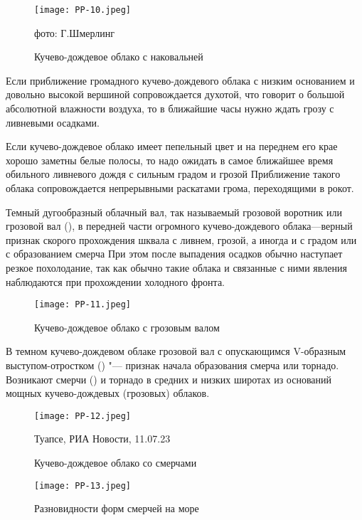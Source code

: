 \begin{figure}[htb]
  \centering{}
  \texttt{[image: PP-10.jpeg]}
  \caption{Кучево-дождевое облако с наковальней}
  \label{fig:pp10}
  \small
  \centering{}фото: Г.Шмерлинг
\end{figure}


 Если приближение громадного кучево-дождевого облака с низким
основанием и довольно высокой вершиной сопровождается духотой, что
говорит о большой абсолютной влажности воздуха, то в ближайшие часы
нужно ждать грозу с ливневыми осадками.

 Если кучево-дождевое облако имеет пепельный цвет и на переднем
его крае хорошо заметны белые полосы, то надо ожидать в самое
ближайшее время обильного ливневого дождя с сильным градом и грозой
Приближение такого облака сопровождается непрерывными раскатами грома,
переходящими в рокот.

 Темный дугообразный облачный вал, так называемый грозовой
воротник или грозовой вал (), в передней части огромного
кучево-дождевого облака—верный признак скорого прохождения шквала с
ливнем, грозой, а иногда и с градом или с образованием смерча При этом
после выпадения осадков обычно наступает резкое похолодание, так как
обычно такие облака и связанные с ними явления наблюдаются при
прохождении холодного фронта.

\begin{figure}[htb]
  \centering{}
  \texttt{[image: PP-11.jpeg]}
  \caption{Кучево-дождевое облако с грозовым валом}
  \label{fig:pp11}
  \small
  \centering{}
\end{figure}

 В темном кучево-дождевом облаке грозовой вал с опускающимся
V-образным выступом-отростком () "--- признак начала образования
смерча или торнадо. Возникают смерчи () и торнадо в средних и
низких широтах из оснований мощных кучево-дождевых (грозовых) облаков.

\begin{figure}[htb]
  \centering{}
  \texttt{[image: PP-12.jpeg]}
  \caption{Кучево-дождевое облако со смерчами}
  \label{fig:pp12}
  \small
  \centering{}Туапсе, РИА Новости, 11.07.23
\end{figure}

\begin{figure}[htb]
  \centering{}
  \texttt{[image: PP-13.jpeg]}
  \caption{Разновидности форм смерчей на море}
  \label{fig:pp13}
  \small
  \centering{}
\end{figure}

